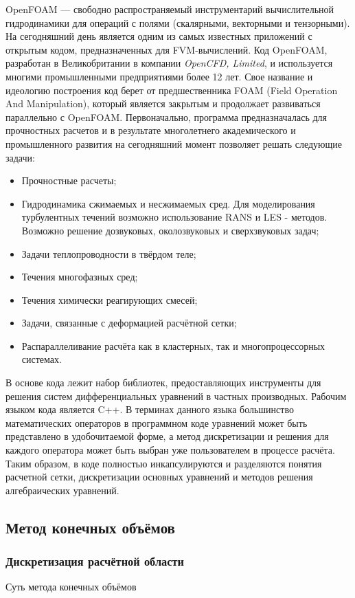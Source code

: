 \documentclass[pdftex,a4paper,12pt]{article}
\begin{document}
		\hspace{2em}OpenFOAM — свободно распространяемый инструментарий вычислительной гидродинамики для операций с полями (скалярными, векторными и тензорными). На сегодняшний день является одним из самых известных приложений с открытым кодом, предназначенных для FVM-вычислений.\cite{openfoam}
		Код OpenFOAM, разработан в Великобритании в компании \textit{OpenCFD, Limited}, и используется многими промышленными предприятиями более 12 лет. Свое название и идеологию построения код берет от предшественника FOAM (Field Operation And Manipulation), который является закрытым и продолжает развиваться параллельно с OpenFOAM. Первоначально, программа предназначалась для прочностных расчетов и в результате многолетнего академического и промышленного развития на сегодняшний момент позволяет решать следующие задачи:
	\begin{itemize}
		\item Прочностные расчеты;
		\item Гидродинамика сжимаемых и несжимаемых сред. Для моделирования турбулентных течений возможно использование RANS и LES - методов. Возможно решение дозвуковых, околозвуковых и сверхзвуковых задач;
		\item Задачи теплопроводности в твёрдом теле;
		\item Течения многофазных сред;
		\item Течения химически реагирующих смесей;
		\item Задачи, связанные с деформацией расчётной сетки;
		\item Распараллеливание расчёта как в кластерных, так и многопроцессорных системах.
	\end{itemize}

	В основе кода лежит набор библиотек, предоставляющих инструменты для решения систем дифференциальных уравнений в частных производных. Рабочим языком кода является C++. В терминах данного языка большинство математических операторов в программном коде уравнений может быть представлено в удобочитаемой форме, а метод дискретизации и решения для каждого оператора может быть выбран уже пользователем в процессе расчёта. Таким образом, в коде полностью инкапсулируются и разделяются понятия расчетной сетки, дискретизации основных уравнений и методов решения алгебраических уравнений.
	\newpage
	\subsection{Метод конечных объёмов \cite{OPNFPG}}
		\subsubsection{Дискретизация расчётной области}
			Суть метода конечных объёмов 
\end{document}

